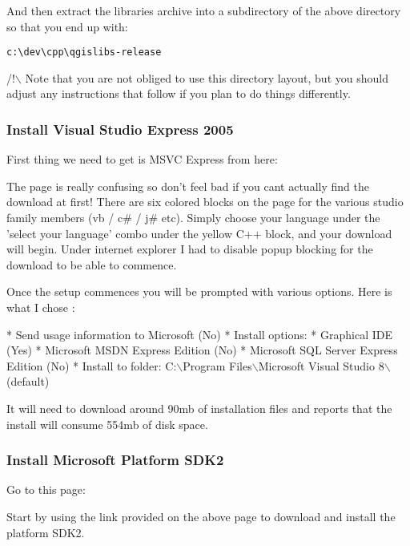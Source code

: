 And then extract the libraries archive into a subdirectory of the above
directory so that you end up with:

\begin{verbatim}
c:\dev\cpp\qgislibs-release
\end{verbatim}

/!$\backslash$ Note that you are not obliged to use this directory layout, but you 
should adjust any instructions that follow if you plan to do things 
differently.

\subsubsection{Install Visual Studio Express 2005}
First thing we need to get is MSVC Express from here:


The page is really confusing so don't feel bad if you cant actually find the 
download at first! There are six colored blocks on the page for the various  
studio family members (vb / c\# / j\# etc). Simply choose your language under 
the 'select your language' combo under the yellow C++ block, and your download 
will begin. Under internet explorer I had to disable popup blocking for the 
download to be able to commence.

Once the setup commences you will be prompted with various options. Here is what 
I chose :

 * Send usage information to Microsoft    (No)
 * Install options:
   * Graphical IDE                        (Yes)
   * Microsoft MSDN Express Edition       (No)
   * Microsoft SQL Server Express Edition (No)
 * Install to folder: C:$\backslash$Program Files$\backslash$Microsoft Visual Studio 8$\backslash$   (default)

It will need to download around 90mb of installation files and reports 
that the install will consume 554mb of disk space.

\subsubsection{Install Microsoft Platform SDK2}
Go to this page:


Start by using the link provided on the above page to download and install the
platform SDK2.

